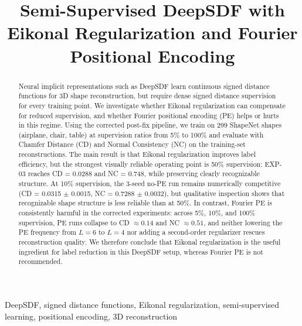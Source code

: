 \documentclass[conference]{IEEEtran}
\begin{document}
\title{Semi-Supervised DeepSDF with Eikonal Regularization and Fourier Positional Encoding}

\author{
}

\maketitle

\begin{abstract}
Neural implicit representations such as DeepSDF learn continuous signed distance functions for 3D shape reconstruction, but require dense signed distance supervision for every training point. We investigate whether Eikonal regularization can compensate for reduced supervision, and whether Fourier positional encoding (PE) helps or hurts in this regime. Using the corrected post-fix pipeline, we train on 299 ShapeNet shapes (airplane, chair, table) at supervision ratios from 5\% to 100\% and evaluate with Chamfer Distance (CD) and Normal Consistency (NC) on the training-set reconstructions. The main result is that Eikonal regularization improves label efficiency, but the strongest visually reliable operating point is 50\% supervision: EXP-03 reaches CD = 0.0288 and NC = 0.748, while preserving clearly recognizable structure. At 10\% supervision, the 3-seed no-PE run remains numerically competitive (CD = 0.0315 $\pm$ 0.0015, NC = 0.7288 $\pm$ 0.0032), but qualitative inspection shows that recognizable shape structure is less reliable than at 50\%. In contrast, Fourier PE is consistently harmful in the corrected experiments: across 5\%, 10\%, and 100\% supervision, PE runs collapse to CD $\approx 0.14$ and NC $\approx 0.51$, and neither lowering the PE frequency from $L=6$ to $L=4$ nor adding a second-order regularizer rescues reconstruction quality. We therefore conclude that Eikonal regularization is the useful ingredient for label reduction in this DeepSDF setup, whereas Fourier PE is not recommended.
\end{abstract}

\begin{IEEEkeywords}
DeepSDF, signed distance functions, Eikonal regularization, semi-supervised learning, positional encoding, 3D reconstruction
\end{IEEEkeywords}
\end{document}
